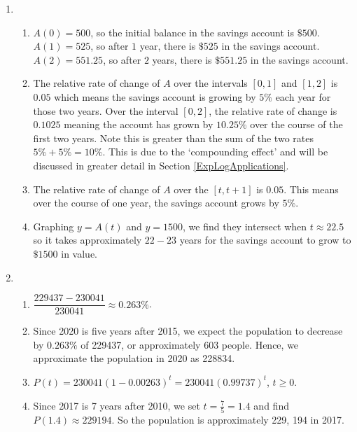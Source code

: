 \begin{enumerate}
\item  \begin{enumerate}

\item   $A(0) = 500$, so the initial balance in the savings account is $\$500$.  $A(1) = 525$, so after $1$ year, there is $\$525$ in the savings account.   $A(2) =551.25$, so after $2$ years, there is $\$551.25$ in the savings account. 

\item  The relative rate of change of $A$ over the intervals $[0,1]$ and $[1,2]$ is $0.05$ which means the savings account is growing by $5 \%$ each year for those two years.  Over the interval $[0,2]$, the relative rate of change is $0.1025$ meaning the account has grown by $10.25 \%$ over the course of the first two years.  Note this is greater than the sum of the two rates $5 \% + 5 \% = 10 \%$.  This is due to the `compounding effect' and will be discussed in greater detail in Section \ref{ExpLogApplications}.

\item  The relative rate of change of $A$ over the $[t, t+1]$ is $0.05$. This means over the course of one year, the savings account grows by $5 \%$.

\item Graphing $y= A(t)$ and $y = 1500$, we find they intersect when $t \approx 22.5$ so it takes approximately $22-23$ years for the savings account to grow to $\$1500$ in value.

\end{enumerate}

\item  \begin{enumerate}

\item $\dfrac{229437-230041}{230041} \approx 0.263 \%$.

\item  Since 2020 is five years after 2015, we expect the population to decrease by  $0.263 \%$ of 229437, or approximately 603 people.  Hence, we approximate the population in 2020 as 228834.

\item  $P(t) = 230041(1-0.00263)^t = 230041(0.99737)^{t}$, $t \geq 0$.

\item  Since 2017 is 7 years after 2010, we set $t = \frac{7}{5} = 1.4$ and find $P(1.4) \approx 229194$.  So the population is approximately 229, 194 in 2017.  


\end{enumerate}
\end{enumerate}
